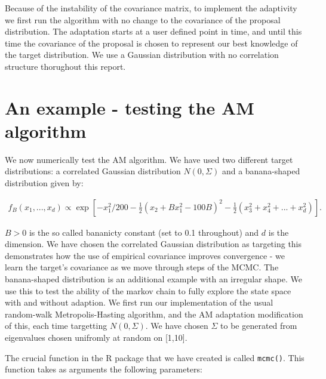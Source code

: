 \documentclass{article}
\begin{document}
Because of the instability of the covariance matrix, to implement the adaptivity we first run the algorithm with no change to the covariance of the proposal distribution. The adaptation starts at a user defined point in time, and until this time the covariance of the proposal is chosen to represent our best knowledge of the target distribution. We use a Gaussian distribution with no correlation structure thorughout this report.


\section{An example - testing the AM algorithm}

We now numerically test the AM algorithm. We have used two different target distributions: a correlated Gaussian distribution $N(0,\Sigma)$ and a banana-shaped distribution \citep{roberts2009} given by:

\begin{align}
f_B\left(x_1,...,x_d\right)\propto \exp \left[ -x_1^2/200 - \frac{1}{2} \left(x_2 + Bx_1^2-100B\right)^2 - \frac{1}{2} \left(x_3^2 + x_4^2 + ... + x_d^2\right) \right].
\end{align}

$B > 0$ is the so called bananicty constant (set to 0.1 throughout) and $d$ is the dimension. We have chosen the correlated Gaussian distribution as targeting this demonstrates how the use of empirical covariance improves convergence - we learn the target's covariance as we move through steps of the MCMC. The banana-shaped distribution is an additional example with an irregular shape. We use this to test the ability of the markov chain to fully explore the state space with and without adaption. We first run our implementation of the usual random-walk Metropolis-Hasting algorithm, and the AM adaptation modification of this, each time targetting $N(0,\Sigma)$. We have chosen $\Sigma$ to be generated from eigenvalues chosen unifromly at random on [1,10].

The crucial function in the R package that we have created is called \texttt{mcmc()}. This function takes as arguments the following parameters:

\begin{knitrout}
\color{fgcolor}\begin{kframe}
\begin{alltt}
 \hlkwb{=}                              
 \hlkwb{=}                     
 \hlkwb{=} \hlstd{(}                     
 \hlkwb{=}                     
 \hlkwb{=}                       
 \hlkwb{=}              
\hlkwb{=} 
\end{alltt}
\end{kframe}
\end{knitrout}
\end{document}
